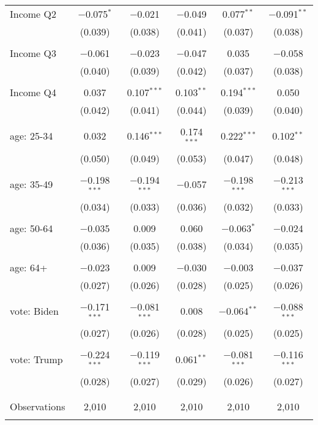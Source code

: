 \begin{tabular}{@{\extracolsep{5pt}}lccccc}
 Income Q2 & $-$0.075$^{*}$ & $-$0.021 & $-$0.049 & 0.077$^{**}$ & $-$0.091$^{**}$ \\ 
  & (0.039) & (0.038) & (0.041) & (0.037) & (0.038) \\ 
  & & & & & \\ 
 Income Q3 & $-$0.061 & $-$0.023 & $-$0.047 & 0.035 & $-$0.058 \\ 
  & (0.040) & (0.039) & (0.042) & (0.037) & (0.038) \\ 
  & & & & & \\ 
 Income Q4 & 0.037 & 0.107$^{***}$ & 0.103$^{**}$ & 0.194$^{***}$ & 0.050 \\ 
  & (0.042) & (0.041) & (0.044) & (0.039) & (0.040) \\ 
  & & & & & \\ 
 age: 25-34 & 0.032 & 0.146$^{***}$ & 0.174$^{***}$ & 0.222$^{***}$ & 0.102$^{**}$ \\ 
  & (0.050) & (0.049) & (0.053) & (0.047) & (0.048) \\ 
  & & & & & \\ 
 age: 35-49 & $-$0.198$^{***}$ & $-$0.194$^{***}$ & $-$0.057 & $-$0.198$^{***}$ & $-$0.213$^{***}$ \\ 
  & (0.034) & (0.033) & (0.036) & (0.032) & (0.033) \\ 
  & & & & & \\ 
 age: 50-64 & $-$0.035 & 0.009 & 0.060 & $-$0.063$^{*}$ & $-$0.024 \\ 
  & (0.036) & (0.035) & (0.038) & (0.034) & (0.035) \\ 
  & & & & & \\ 
 age: 64+ & $-$0.023 & 0.009 & $-$0.030 & $-$0.003 & $-$0.037 \\ 
  & (0.027) & (0.026) & (0.028) & (0.025) & (0.026) \\ 
  & & & & & \\ 
 vote: Biden & $-$0.171$^{***}$ & $-$0.081$^{***}$ & 0.008 & $-$0.064$^{**}$ & $-$0.088$^{***}$ \\ 
  & (0.027) & (0.026) & (0.028) & (0.025) & (0.025) \\ 
  & & & & & \\ 
 vote: Trump & $-$0.224$^{***}$ & $-$0.119$^{***}$ & 0.061$^{**}$ & $-$0.081$^{***}$ & $-$0.116$^{***}$ \\ 
  & (0.028) & (0.027) & (0.029) & (0.026) & (0.027) \\ 
  & & & & & \\ 
\hline \\[-1.8ex] 

Observations & 2,010 & 2,010 & 2,010 & 2,010 & 2,010 \\ 
\hline 
\hline \\[-1.8ex] 
\end{tabular} 
